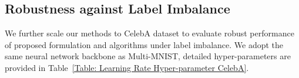 \documentclass[twoside]{article} %
\def\eqref#1{equation~\ref{#1}}
\theoremstyle{plain}
\theoremstyle{definition}
\theoremstyle{remark}
\begin{document}
\subsection{Robustness against Label Imbalance}

We further scale our methods to CelebA dataset to evaluate robust performance of proposed formulation and algorithms under label imbalance. We adopt the same neural network backbone as Multi-MNIST, detailed hyper-parameters are provided in Table~\ref{Table: Learning Rate Hyper-parameter CelebA}.
\end{document}
